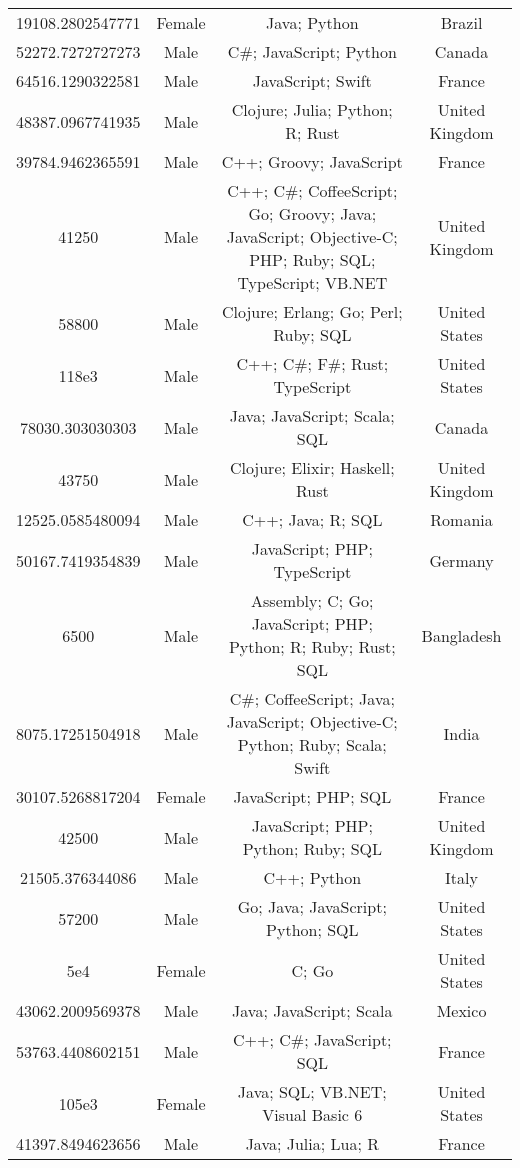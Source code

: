 \begin{center}
\begin{tabular}{ |c|c|c|c| }
19108.2802547771  &  Female  &  Java; Python  &  Brazil  \\ 
52272.7272727273  &  Male  &  C\#; JavaScript; Python  &  Canada  \\ 
64516.1290322581  &  Male  &  JavaScript; Swift  &  France  \\ 
48387.0967741935  &  Male  &  Clojure; Julia; Python; R; Rust  &  United Kingdom  \\ 
39784.9462365591  &  Male  &  C++; Groovy; JavaScript  &  France  \\ 
41250  &  Male  &  C++; C\#; CoffeeScript; Go; Groovy; Java; JavaScript; Objective-C; PHP; Ruby; SQL; TypeScript; VB.NET  &  United Kingdom  \\ 
58800  &  Male  &  Clojure; Erlang; Go; Perl; Ruby; SQL  &  United States  \\ 
118e3  &  Male  &  C++; C\#; F\#; Rust; TypeScript  &  United States  \\ 
78030.303030303  &  Male  &  Java; JavaScript; Scala; SQL  &  Canada  \\ 
43750  &  Male  &  Clojure; Elixir; Haskell; Rust  &  United Kingdom  \\ 
12525.0585480094  &  Male  &  C++; Java; R; SQL  &  Romania  \\ 
50167.7419354839  &  Male  &  JavaScript; PHP; TypeScript  &  Germany  \\ 
6500  &  Male  &  Assembly; C; Go; JavaScript; PHP; Python; R; Ruby; Rust; SQL  &  Bangladesh  \\ 
8075.17251504918  &  Male  &  C\#; CoffeeScript; Java; JavaScript; Objective-C; Python; Ruby; Scala; Swift  &  India  \\ 
30107.5268817204  &  Female  &  JavaScript; PHP; SQL  &  France  \\ 
42500  &  Male  &  JavaScript; PHP; Python; Ruby; SQL  &  United Kingdom  \\ 
21505.376344086  &  Male  &  C++; Python  &  Italy  \\ 
57200  &  Male  &  Go; Java; JavaScript; Python; SQL  &  United States  \\ 
5e4  &  Female  &  C; Go  &  United States  \\ 
43062.2009569378  &  Male  &  Java; JavaScript; Scala  &  Mexico  \\ 
53763.4408602151  &  Male  &  C++; C\#; JavaScript; SQL  &  France  \\ 
105e3  &  Female  &  Java; SQL; VB.NET; Visual Basic 6  &  United States  \\ 
41397.8494623656  &  Male  &  Java; Julia; Lua; R  &  France  \\ 

\end{tabular}
\end{center}

